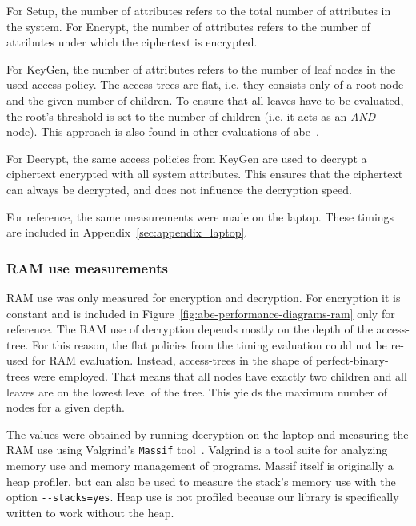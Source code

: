 For Setup, the number of attributes refers to the total number of attributes in the system.
For Encrypt, the number of attributes refers to the number of attributes under which the ciphertext is encrypted.

For KeyGen, the number of attributes refers to the number of leaf nodes in the used access policy.
The \glspl{access-tree} are flat, i.e. they consists only of a root node and the given number of children.
To ensure that all leaves have to be evaluated, the root's threshold is set to the number of children (i.e. it acts as an \emph{AND} node).
This approach is also found in other evaluations of \acrshort{abe}~\cite{girgenti_feasibility_2019}.

For Decrypt, the same access policies from KeyGen are used to decrypt a ciphertext encrypted with all system attributes.
This ensures that the ciphertext can always be decrypted, and does not influence the decryption speed.

For reference, the same measurements were made on the laptop.
These timings are included in Appendix~\ref{sec:appendix_laptop}.

\subsubsection{RAM use measurements}


RAM use was only measured for encryption and decryption. 
For encryption it is constant and is included in Figure~\ref{fig:abe-performance-diagrams-ram} only for reference.
The RAM use of decryption depends mostly on the depth of the \gls{access-tree}.
For this reason, the flat policies from the timing evaluation could not be re-used for RAM evaluation.
Instead, \glspl{access-tree} in the shape of \glspl{perfect-binary-tree} were employed.
That means that all nodes have exactly two children and all leaves are on the lowest level of the tree.
This yields the maximum number of nodes for a given depth.

The values were obtained by running decryption on the laptop and measuring the RAM use using Valgrind's \texttt{Massif} tool~\cite{nethercote_massif_nodate}.
Valgrind is a tool suite for analyzing memory use and memory management of programs.
Massif itself is originally a heap profiler, but can also be used to measure the stack's memory use with the option \verb+--stacks=yes+.
Heap use is not profiled because our library is specifically written to work without the heap.

